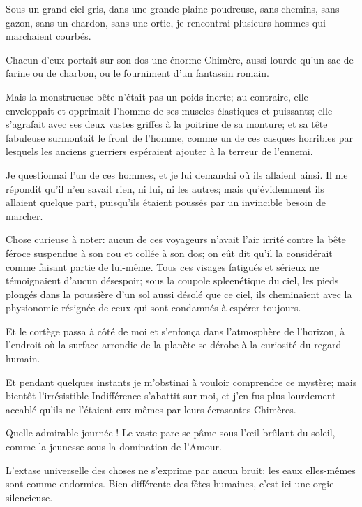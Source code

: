 
Sous un grand ciel gris, dans une grande plaine poudreuse, sans chemins,
sans gazon, sans un chardon, sans une ortie, je rencontrai plusieurs
hommes qui marchaient courbés.

Chacun d’eux portait sur son dos une énorme Chimère,
aussi lourde qu’un sac de farine ou de charbon, ou le
fourniment d’un fantassin romain.

Mais la monstrueuse bête n’était pas un poids inerte;
au contraire, elle enveloppait et opprimait l’homme de
ses muscles élastiques et puissants; elle s’agrafait
avec ses deux vastes griffes à la poitrine de sa monture; et sa tête
fabuleuse surmontait le front de l’homme, comme un de
ces casques horribles par lesquels les anciens guerriers espéraient
ajouter à la terreur de l’ennemi.

Je questionnai l’un de ces hommes, et je lui demandai
où ils allaient ainsi. Il me répondit qu’il
n’en savait rien, ni lui, ni les autres; mais
qu’évidemment ils allaient quelque part,
puisqu’ils étaient poussés par un invincible besoin de
marcher.

Chose curieuse à noter: aucun de ces voyageurs n’avait
l’air irrité contre la bête féroce suspendue à son cou
et collée à son dos; on eût dit qu’il la considérait
comme faisant partie de lui{}-même. Tous ces visages fatigués et
sérieux ne témoignaient d’aucun désespoir; sous la
coupole spleenétique du ciel, les pieds plongés dans la poussière
d’un sol aussi désolé que ce ciel, ils cheminaient
avec la physionomie résignée de ceux qui sont condamnés à espérer
toujours.

Et le cortège passa à côté de moi et s’enfonça dans
l’atmosphère de l’horizon, à
l’endroit où la surface arrondie de la planète se
dérobe à la curiosité du regard humain.

Et pendant quelques instants je m’obstinai à vouloir
comprendre ce mystère; mais bientôt l’irrésistible
Indifférence s’abattit sur moi, et
j’en fus plus lourdement accablé
qu’ils ne l’étaient eux{}-mêmes par
leurs écrasantes Chimères.


Quelle admirable journée ! Le vaste parc se pâme sous
l’\oe il brûlant du soleil, comme la jeunesse sous la
domination de l’Amour.

L’extase universelle des choses ne
s’exprime par aucun bruit; les eaux elles{}-mêmes sont
comme endormies. Bien différente des fêtes humaines,
c’est ici une orgie silencieuse.


